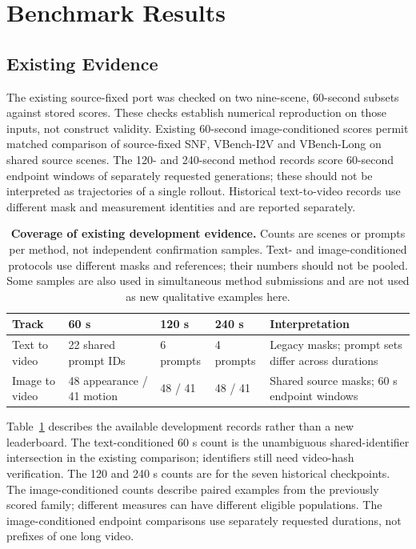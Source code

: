 \section{Benchmark Results}
\label{sec:results}
\subsection{Existing Evidence}
The existing source-fixed port was checked on two nine-scene, 60-second subsets against stored scores. These checks establish numerical reproduction on those inputs, not construct validity. Existing 60-second image-conditioned scores permit matched comparison of source-fixed SNF, VBench-I2V and VBench-Long on shared source scenes. The 120- and 240-second method records score 60-second endpoint windows of separately requested generations; these should not be interpreted as trajectories of a single rollout. Historical text-to-video records use different mask and measurement identities and are reported separately.

\begin{table}[t]
\caption{\textbf{Coverage of existing development evidence.} Counts are scenes or prompts per method, not independent confirmation samples. Text- and image-conditioned protocols use different masks and references; their numbers should not be pooled. Some samples are also used in simultaneous method submissions and are not used as new qualitative examples here.}
\label{tab:existing_evidence}
\centering
\setlength{\tabcolsep}{4pt}
\begin{tabular}{@{}lllll@{}}
\toprule
Track & 60 s & 120 s & 240 s & Interpretation \\
\midrule
Text to video & 22 shared prompt IDs & 6 prompts & 4 prompts & Legacy masks; prompt sets differ across durations \\
Image to video & 48 appearance / 41 motion & 48 / 41 & 48 / 41 & Shared source masks; 60 s endpoint windows \\
\bottomrule
\end{tabular}
\end{table}

Table~\ref{tab:existing_evidence} describes the available development records rather than a new leaderboard. The text-conditioned 60 s count is the unambiguous shared-identifier intersection in the existing comparison; identifiers still need video-hash verification. The 120 and 240 s counts are for the seven historical checkpoints. The image-conditioned counts describe paired examples from the previously scored family; different measures can have different eligible populations. The image-conditioned endpoint comparisons use separately requested durations, not prefixes of one long video.

